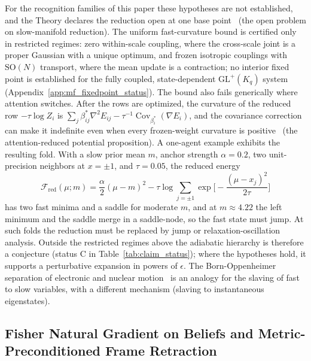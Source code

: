 \documentclass[11pt]{article}
\begin{document}
For the recognition families of this paper these hypotheses are not established, and the Theory declares the reduction open at one base point~\cite[Ch.~8]{DennisGaugeVFE2026} (the open problem on slow-manifold reduction). The uniform fast-curvature bound is certified only in restricted regimes: zero within-scale coupling, where the cross-scale joint is a proper Gaussian with a unique optimum, and frozen isotropic couplings with $\mathrm{SO}(N)$ transport, where the mean update is a contraction; no interior fixed point is established for the fully coupled, state-dependent $\mathrm{GL}^+(K_q)$ system (Appendix~\ref{app:mf_fixedpoint_status}). The bound also fails generically where attention switches. After the rows are optimized, the curvature of the reduced row $-\tau\log Z_i$ is $\sum_j\beta^*_{ij}\nabla^2E_{ij} - \tau^{-1}\operatorname{Cov}_{\beta_i^*}(\nabla E_i)$, and the covariance correction can make it indefinite even when every frozen-weight curvature is positive~\cite[Ch.~6]{DennisGaugeVFE2026} (the attention-reduced potential proposition). A one-agent example exhibits the resulting fold. With a slow prior mean $m$, anchor strength $\alpha = 0.2$, two unit-precision neighbors at $x = \pm 1$, and $\tau = 0.05$, the reduced energy
\begin{equation}
\mathcal{F}_{\mathrm{red}}(\mu; m) = \frac{\alpha}{2}(\mu - m)^2 - \tau\log\sum_{j=\pm1}\exp\Big[-\frac{(\mu - x_j)^2}{2\tau}\Big]
\end{equation}
has two fast minima and a saddle for moderate $m$, and at $m \approx 4.22$ the left minimum and the saddle merge in a saddle-node, so the fast state must jump. At such folds the reduction must be replaced by jump or relaxation-oscillation analysis. Outside the restricted regimes above the adiabatic hierarchy is therefore a conjecture (status C in Table~\ref{tab:claim_status}); where the hypotheses hold, it supports a perturbative expansion in powers of $\epsilon$. The Born-Oppenheimer separation of electronic and nuclear motion~\cite{Born1927} is an analogy for the slaving of fast to slow variables, with a different mechanism (slaving to instantaneous eigenstates).

\subsection{Fisher Natural Gradient on Beliefs and Metric-Preconditioned Frame Retraction}
\end{document}
